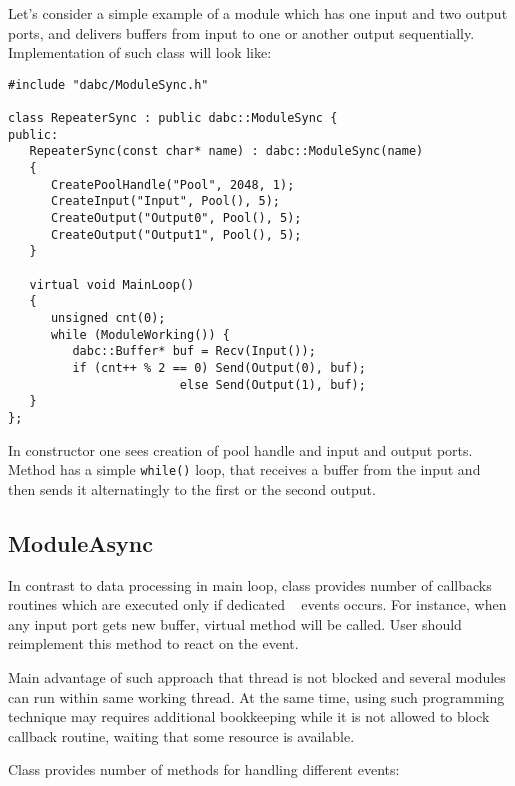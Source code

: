 Let's consider a simple example of a  module 
which has one input and two output ports, and delivers buffers from input to
one or another output sequentially. Implementation of such 
class will look like:
\begin{small}
\begin{verbatim}
#include "dabc/ModuleSync.h"

class RepeaterSync : public dabc::ModuleSync {
public:
   RepeaterSync(const char* name) : dabc::ModuleSync(name)
   {
      CreatePoolHandle("Pool", 2048, 1);
      CreateInput("Input", Pool(), 5);
      CreateOutput("Output0", Pool(), 5);
      CreateOutput("Output1", Pool(), 5);
   }
     
   virtual void MainLoop()
   {
      unsigned cnt(0);
      while (ModuleWorking()) {
         dabc::Buffer* buf = Recv(Input());
         if (cnt++ % 2 == 0) Send(Output(0), buf);
                        else Send(Output(1), buf);
   }
};
\end{verbatim}
\end{small}

In constructor one sees creation of pool handle and input and output ports.
Method  has a simple {\tt while()} loop, 
that receives a buffer from the
input and then sends it alternatingly to the first or the second output.

  
\subsection{ModuleAsync}
\label{plugin_module_async}

In contrast to data processing in  main loop,
class  provides 
number of callbacks routines which are executed only if dedicated \dabc~ events occurs.
For instance, when any input port gets new buffer, virtual method  will
be called. User should reimplement this method to react on the event.

Main advantage of such approach that thread is not blocked and
several modules  can run within same working thread.
At the same time, using such programming technique may requires additional 
bookkeeping while it is not allowed to block callback routine, waiting that
some resource is available.

Class  provides number of methods for handling different events:

